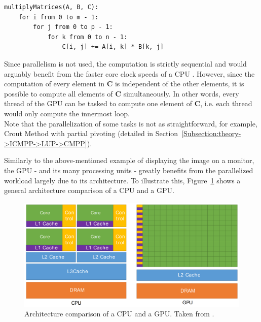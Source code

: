 \begin{lstlisting}[caption={Pseudocode for the multiplication of two matrices.
Let $\mathbf{A}$ be a $m\times n$ matrix, $\mathbf{B}$ a $n\times p$ matrix, and $\mathbf{C}$ a $m\times p$ matrix.},label={Listing:theory->GPUs->GPGPUs->multiplication-of-matrices}]
multiplyMatrices(A, B, C):
	for i from 0 to m - 1:
		for j from 0 to p - 1:
			for k from 0 to n - 1:
				C[i, j] += A[i, k] * B[k, j]
\end{lstlisting}

Since parallelism is not used, the computation is strictly sequential and would arguably benefit from the faster core clock speeds of a CPU \cite{Cejka2022}.
However, since the computation of every element in $\mathbf{C}$ is independent of the other elements, it is possible to compute all elements of $\mathbf{C}$ simultaneously.
In other words, every thread of the GPU can be tasked to compute one element of $\mathbf{C}$, i.e. each thread would only compute the innermost loop.\\
Note that the parallelization of some tasks is not as straightforward, for example, Crout Method with partial pivoting (detailed in Section~\ref{Subsection:theory->ICMPP->LUP->CMPP}).

Similarly to the above-mentioned example of displaying the image on a monitor, the GPU - and its many processing units - greatly benefits from the parallelized workload largely due to its architecture.
To illustrate this, Figure~\ref{Figure:theory->GPUs->GPGPU->CPU-nvidia-GPU-architecture-comparison} shows a general architecture comparison of a CPU and a GPU.

\begin{figure}[ht!]
	\centering
	\includegraphics[width=14cm, keepaspectratio]{images/ch01/nvidia_CPU_GPU_comparison.png}
	\caption{Architecture comparison of a CPU and a GPU.
		Taken from  \cite{NVIDIADecember2022}.
	}
	\label{Figure:theory->GPUs->GPGPU->CPU-nvidia-GPU-architecture-comparison}
\end{figure}

